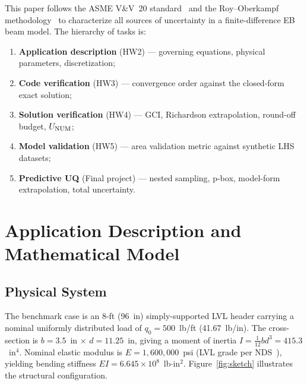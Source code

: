 \documentclass[10pt,twocolumn]{article}
\begin{document}
This paper follows the ASME V\&V~20 standard~\cite{asme2009} and
the Roy--Oberkampf methodology~\cite{roy2011} to characterize all
sources of uncertainty in a finite-difference EB beam model.
The hierarchy of tasks is:
\begin{enumerate}[leftmargin=*, itemsep=0pt]
  \item \textbf{Application description} (HW2) --- governing equations,
    physical parameters, discretization;
  \item \textbf{Code verification} (HW3) --- convergence order against
    the closed-form exact solution;
  \item \textbf{Solution verification} (HW4) --- GCI, Richardson
    extrapolation, round-off budget, $U_{\rm NUM}$;
  \item \textbf{Model validation} (HW5) --- area validation metric
    against synthetic LHS datasets;
  \item \textbf{Predictive UQ} (Final project) --- nested sampling,
    p-box, model-form extrapolation, total uncertainty.
\end{enumerate}

\section{Application Description and Mathematical Model}
\label{sec:application}

\subsection{Physical System}
\label{sec:phys}

The benchmark case is an 8-ft (96~in) simply-supported LVL header
carrying a nominal uniformly distributed load of $q_0=500$~lb/ft
(41.67~lb/in).
The cross-section is $b=3.5$~in $\times$ $d=11.25$~in, giving a
moment of inertia $I=\tfrac{1}{12}bd^3=415.3$~in$^4$.
Nominal elastic modulus is $E=1{,}600{,}000$~psi (LVL grade per
NDS~\cite{nds2018}), yielding bending stiffness
$EI=6.645\times10^8$~lb$\cdot$in$^2$.
Figure~\ref{fig:sketch} illustrates the structural configuration.
\end{document}
